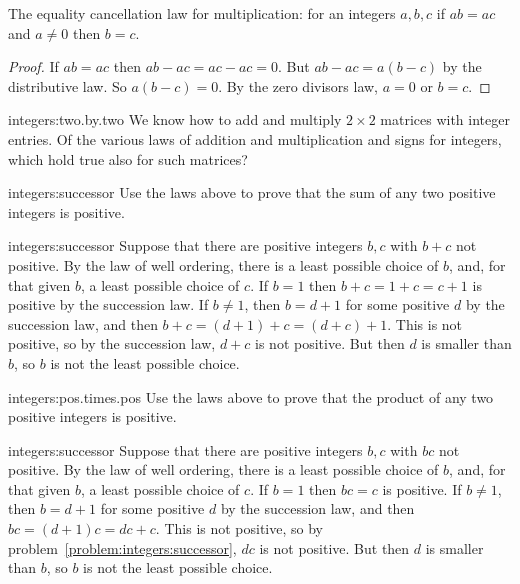 \begin{theorem} The equality cancellation law for multiplication: for an integers \(a,b,c\) if \(ab=ac\) and \(a\ne 0\) then \(b=c\).
\end{theorem}
\begin{proof}
If \(ab=ac\) then \(ab-ac=ac-ac=0\).
But \(ab-ac=a(b-c)\) by the distributive law.
So \(a(b-c)=0\). By the zero divisors law, \(a=0\) or \(b=c\).
\end{proof}

\begin{problem}{integers:two.by.two}
We know how to add and multiply \(2 \times 2\) matrices with integer entries.
Of the various laws of addition and multiplication and signs for integers, which hold true also for such matrices?
\end{problem}

\begin{problem}{integers:successor}
Use the laws above to prove that the sum of any two positive integers is positive.
\end{problem}
\begin{answer}{integers:successor}
Suppose that there are positive integers \(b,c\) with \(b+c\) not positive.
By the law of well ordering, there is a least possible choice of \(b\), and, for that given \(b\), a least possible choice of \(c\).
If \(b=1\) then \(b+c=1+c=c+1\) is positive by the succession law.
If \(b \ne 1\), then \(b=d+1\) for some positive \(d\) by the succession law, and then \(b+c=(d+1)+c=(d+c)+1\).
This is not positive, so by the succession law, \(d+c\) is not positive.
But then \(d\) is smaller than \(b\), so \(b\) is not the least possible choice.
\end{answer}

\begin{problem}{integers:pos.times.pos}
Use the laws above to prove that the product of any two positive integers is positive.
\end{problem}
\begin{answer}{integers:successor}
Suppose that there are positive integers \(b,c\) with \(bc\) not positive.
By the law of well ordering, there is a least possible choice of \(b\), and, for that given \(b\), a least possible choice of \(c\).
If \(b=1\) then \(bc=c\) is positive.
If \(b \ne 1\), then \(b=d+1\) for some positive \(d\) by the succession law, and then \(bc=(d+1)c=dc+c\).
This is not positive, so by problem~\vref{problem:integers:successor}, \(dc\) is not positive.
But then \(d\) is smaller than \(b\), so \(b\) is not the least possible choice.
\end{answer}

